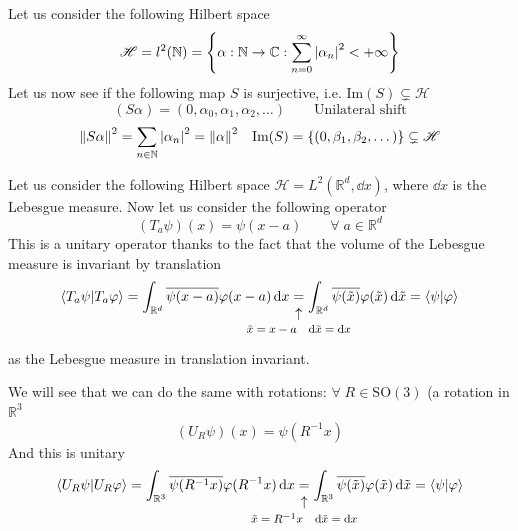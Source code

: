 \documentclass[../main.tex]{subfiles}
\begin{document}
\begin{example}
Let us consider the following Hilbert space
\[
\mathcal{H}=l^2(\mathbb{N})=\left\{\alpha:\mathbb{N}\to\mathbb{C}:\sum_{n=0}^\infty\abs{\alpha_n}^2<+\infty\right\}
\]
Let us now see if the following map $S$ is surjective, i.e. $\textrm{Im}(S)\subsetneq\mathcal{H}$
\[
\left(S\alpha\right)=(0,\alpha_0,\alpha_1,\alpha_2,\dots) \qquad \textrm{Unilateral shift}
\]
\[
\norm{S\alpha}^2=\sum_{n\in\mathbb{N}}\abs{\alpha_n}^2=\norm{\alpha}^2 \quad \textrm{Im}(S)=\left\{\left(0,\beta_1,\beta_2,\dots\right)\right\}\subsetneq\mathcal{H}
\]
\end{example}
\begin{example}
Let us consider the following Hilbert space $\mathcal{H}=L^2(\mathbb{R}^d,\dd{x})$, where $\dd{x}$ is the Lebesgue measure. Now let us consider the following operator
\[
\left(T_a\psi\right)(x)=\psi(x-a)\qquad \forall\;a\in\mathbb{R}^d
\]
This is a unitary operator thanks to the fact that the volume of the Lebesgue measure is invariant by translation
\[
\braket{T_a\psi}{T_a\varphi}=\int_{\mathbb{R}^d}\overline{\psi(x-a)}\varphi(x-a)\dd{x}\underset{\mathclap{\tikz \node {$\uparrow$} node [below=1ex] {\footnotesize $\tilde{x}=x-a\quad \dd\tilde{x}=\dd{x}$};}}{=}\int_{\mathbb{R}^d}\overline{\psi(\tilde{x})}\varphi(\tilde{x})\dd{\tilde{x}}=\braket{\psi}{\varphi}
\]
as the Lebesgue measure in translation invariant.

We will see that we can do the same with rotations: $\forall\; R\in\textrm{SO}(3)$ (a rotation in $\mathbb{R}^3$
\[
\left(U_R\psi\right)(x)=\psi(R^{-1}x)
\]
And this is unitary
\[
\braket{U_R\psi}{U_R\varphi}=\int_{\mathbb{R}^3}\overline{\psi(R^{-1}x)}\varphi(R^{-1}x)\dd{x}\underset{\mathclap{\tikz \node {$\uparrow$} node [below=1ex] {\footnotesize $\tilde{x}=R^{-1}x\quad \dd\tilde{x}=\dd{x}$};}}{=}\int_{\mathbb{R}^3}\overline{\psi(\tilde{x})}\varphi(\tilde{x})\dd{\tilde{x}}=\braket{\psi}{\varphi}
\]
\end{example}
\end{document}
